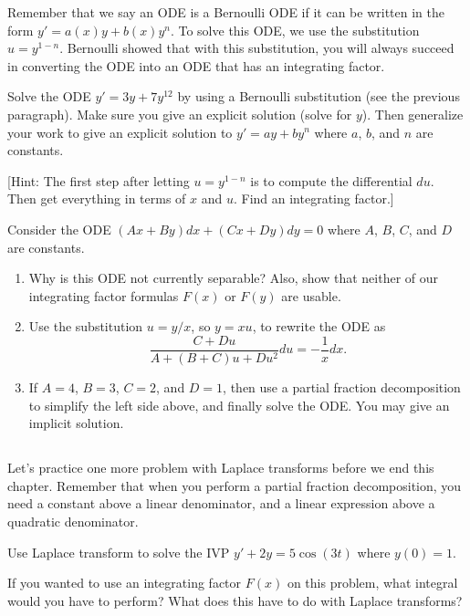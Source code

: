 Remember that we say an ODE is a Bernoulli ODE if it can be written in the form $y'=a(x) y +b(x) y^n$.  To solve this ODE, we use the substitution $u=y^{1-n}$. Bernoulli showed that with this substitution, you will always succeed in converting the ODE into an ODE that has an integrating factor. 
\begin{problem}
Solve the ODE $y'=3y+7y^{12}$ by using a Bernoulli substitution (see the previous paragraph). Make sure you give an explicit solution (solve for $y$). Then generalize your work to give an explicit solution to $y'=ay+by^n$ where $a$, $b$, and $n$ are constants. 

[Hint: The first step after letting  $u=y^{1-n}$ is to compute the differential $du$. Then get everything in terms of $x$ and $u$. Find an integrating factor.]
\end{problem}


\begin{problem}
Consider the ODE $(Ax+By)dx+(Cx+Dy)dy=0$ where $A$, $B$, $C$, and $D$ are constants. 
\begin{enumerate}
 \item Why is this ODE not currently separable? Also, show that neither of our integrating factor formulas $F(x)$ or $F(y)$ are usable. 
 \item Use the substitution $u=y/x$, so $y=xu$, to rewrite the ODE as 
$$\frac{C+Du}{A+(B+C)u+Du^2}du=-\frac{1}{x}dx.$$
 \item If $A=4$, $B=3$, $C=2$, and $D=1$, then use a partial fraction decomposition to simplify the left side above, and finally solve the ODE.  You may give an implicit solution.
\end{enumerate}
\end{problem}

\subsection*{\ideaC}
Let's practice one more problem with Laplace transforms before we end this chapter.  Remember that when you perform a partial fraction decomposition, you need a constant above a linear denominator, and a linear expression above a quadratic denominator. 
\begin{problem}
Use Laplace transform to solve the IVP $y'+2y=5\cos(3t)$ where $y(0)=1$.

If you wanted to use an integrating factor $F(x)$ on this problem, what integral would you have to perform? What does this have to do with Laplace transforms?
\end{problem}

